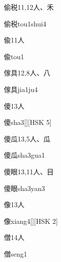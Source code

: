\begin{entry}{偷税}{11,12}{⼈、⽲}
  \begin{phonetics}{偷税}{tou1shui4}
  \end{phonetics}
\end{entry}

\begin{entry}{偸}{11}{⼈}
  \begin{phonetics}{偸}{tou1}
  \end{phonetics}
\end{entry}

\begin{entry}{傢具}{12,8}{⼈、⼋}
  \begin{phonetics}{傢具}{jia1ju4}
  \end{phonetics}
\end{entry}

\begin{entry}{傻}{13}{⼈}
  \begin{phonetics}{傻}{sha3}[][HSK 5]
  \end{phonetics}
\end{entry}

\begin{entry}{傻瓜}{13,5}{⼈、⽠}
  \begin{phonetics}{傻瓜}{sha3gua1}
  \end{phonetics}
\end{entry}

\begin{entry}{傻眼}{13,11}{⼈、⽬}
  \begin{phonetics}{傻眼}{sha3yan3}
  \end{phonetics}
\end{entry}

\begin{entry}{像}{13}{⼈}
  \begin{phonetics}{像}{xiang4}[][HSK 2]
  \end{phonetics}
\end{entry}

\begin{entry}{僧}{14}{⼈}
  \begin{phonetics}{僧}{seng1}
  \end{phonetics}
\end{entry}

